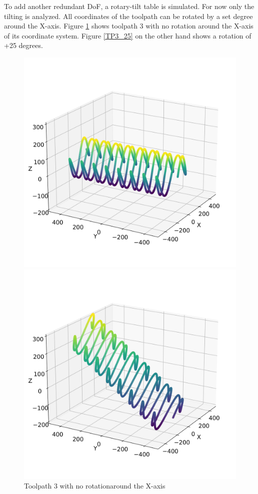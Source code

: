 To add another redundant DoF, a rotary-tilt table is simulated. For now only the tilting is analyzed. All coordinates of the toolpath can be rotated by a set degree around the X-axis. Figure \ref{TP3_0} shows toolpath 3 with no rotation around the X-axis of its coordinate system. Figure \ref{TP3_25} on the other hand shows a rotation of +25 degrees.
\begin{figure}[H]%
	\centering
	\begin{minipage}{0.5\textwidth}
		\includegraphics[width=\textwidth]{figures/path3_kipp_0.png}
		\caption{Toolpath 3 with no rotation\newline around the X-axis}
		\label{TP3_0}
	\end{minipage}\hfill
	\begin{minipage}{0.5\textwidth}
		\includegraphics[width=\textwidth]{figures/path3_kipp_25_comparison.png}

\end{minipage}
\end{figure}
